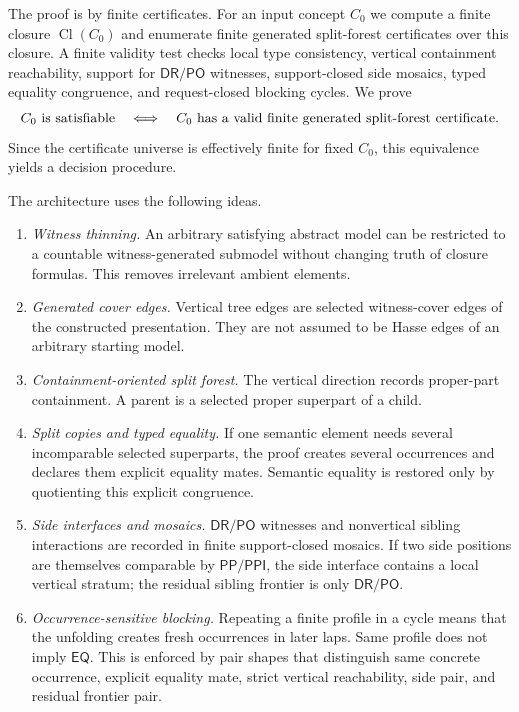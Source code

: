 \documentclass[11pt]{article}
\newcommand{\EQ}{\mathsf{EQ}}
\newcommand{\DR}{\mathsf{DR}}
\newcommand{\PO}{\mathsf{PO}}
\newcommand{\PP}{\mathsf{PP}}
\newcommand{\PPI}{\mathsf{PPI}}
\newcommand{\Cl}{\operatorname{Cl}}
\begin{document}
The proof is by finite certificates.  For an input concept $C_0$ we compute a finite closure $\Cl(C_0)$ and enumerate finite generated split-forest certificates over this closure.  A finite validity test checks local type consistency, vertical containment reachability, support for $\DR/\PO$ witnesses, support-closed side mosaics, typed equality congruence, and request-closed blocking cycles.  We prove
\[
 C_0\hbox{ is satisfiable}
 \quad\Longleftrightarrow\quad
 C_0\hbox{ has a valid finite generated split-forest certificate.}
\]
Since the certificate universe is effectively finite for fixed $C_0$, this equivalence yields a decision procedure.

The architecture uses the following ideas.
\begin{enumerate}[label=(A\arabic*)]
\item \emph{Witness thinning.}  An arbitrary satisfying abstract model can be restricted to a countable witness-generated submodel without changing truth of closure formulas.  This removes irrelevant ambient elements.
\item \emph{Generated cover edges.}  Vertical tree edges are selected witness-cover edges of the constructed presentation.  They are not assumed to be Hasse edges of an arbitrary starting model.
\item \emph{Containment-oriented split forest.}  The vertical direction records proper-part containment.  A parent is a selected proper superpart of a child.
\item \emph{Split copies and typed equality.}  If one semantic element needs several incomparable selected superparts, the proof creates several occurrences and declares them explicit equality mates.  Semantic equality is restored only by quotienting this explicit congruence.
\item \emph{Side interfaces and mosaics.}  $\DR/\PO$ witnesses and nonvertical sibling interactions are recorded in finite support-closed mosaics.  If two side positions are themselves comparable by $\PP/\PPI$, the side interface contains a local vertical stratum; the residual sibling frontier is only $\DR/\PO$.
\item \emph{Occurrence-sensitive blocking.}  Repeating a finite profile in a cycle means that the unfolding creates fresh occurrences in later laps.  Same profile does not imply $\EQ$.  This is enforced by pair shapes that distinguish same concrete occurrence, explicit equality mate, strict vertical reachability, side pair, and residual frontier pair.
\end{enumerate}
\end{document}
